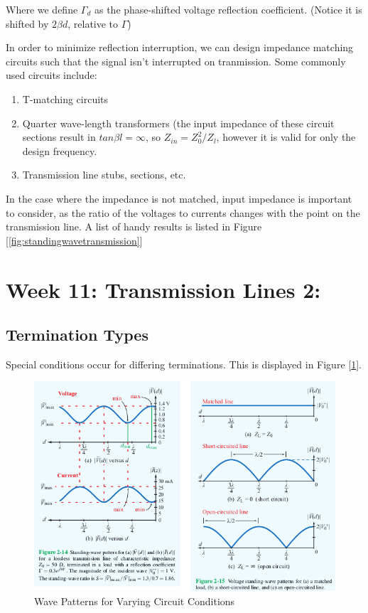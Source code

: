 \documentclass{book}
\begin{document}
Where we define $\Gamma_d$ as the phase-shifted voltage reflection coefficient. (Notice it is shifted by $2\beta d$, relative to $\Gamma$)

In order to minimize reflection interruption, we can design impedance matching circuits such that the signal isn't interrupted on tranmission.
Some commonly used circuits include:

\begin{enumerate}
	\item T-matching circuits
	\item Quarter wave-length transformers (the input impedance of these circuit sections result in $tan\beta l = \infty$, so $Z_{in}= Z_0^2/Z_l$, however it is valid for only the design frequency.
	\item Transmission line stubs, sections, etc.
\end{enumerate}

In the case where the impedance is not matched, input impedance is important to consider, as the ratio of the voltages to currents changes with the point on the transmission line. A list of handy results is listed in Figure [\ref{fig:standingwavetransmission}]

\section{Week 11: Transmission Lines 2:}
\subsection{Termination Types}

Special conditions occur for differing terminations. This is displayed in Figure [\ref{fig:wavepatternscircuitconditions}].
\begin{figure}[h]
	\centering
	\includegraphics[width=0.5\linewidth]{Screenshots/wave_patterns_circuit_conditions}
	\caption{Wave Patterns for Varying Circuit Conditions}
	\label{fig:wavepatternscircuitconditions}
\end{figure}
\end{document}
